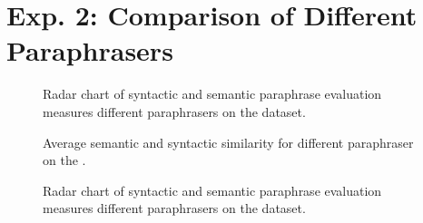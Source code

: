 \section{Exp. 2: Comparison of Different Paraphrasers}
\label{sec:app_paraphrases}

\begin{figure}[H]
    \centering
    
    \caption{Radar chart of syntactic and semantic paraphrase evaluation measures different paraphrasers on the \dataBlog{} dataset.}
    \label{fig:radar_blog}
\end{figure}


\begin{figure}[H]
    \centering
    
    \caption{Average semantic and syntactic similarity for different paraphraser on the \dataGutenberg{}.}
    \label{fig:sem_syn_gutenberg}
\end{figure}

\begin{figure}[H]
    \centering
    
    \caption{Radar chart of syntactic and semantic paraphrase evaluation measures different paraphrasers on the \dataGutenberg{} dataset.}
    \label{fig:radar_gutenberg}
\end{figure}
